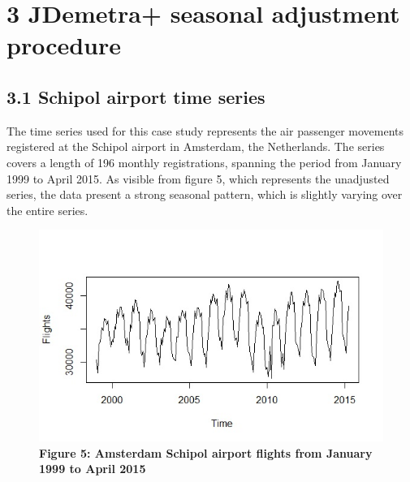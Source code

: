 \documentclass{article}
\begin{document}
\section*{3 JDemetra+ seasonal adjustment procedure}
\subsection*{\small 3.1 Schipol airport time series}
The time series used for this case study represents the air passenger movements registered at the Schipol airport in Amsterdam, the Netherlands. The series covers a length of 196 monthly registrations, spanning the period from January 1999 to April 2015. As visible from figure 5, which represents the unadjusted series, the data present a strong seasonal pattern, which is slightly varying over the entire series.
\begin{figure}[H]
\centering
  \includegraphics[width=\linewidth]{../images/capitolo3/series.jpg}
  {\textbf{\scriptsize Figure 5: Amsterdam Schipol airport flights from January 1999 to April 2015}}
  \label{fig:1}
\end{figure}
\end{document}
